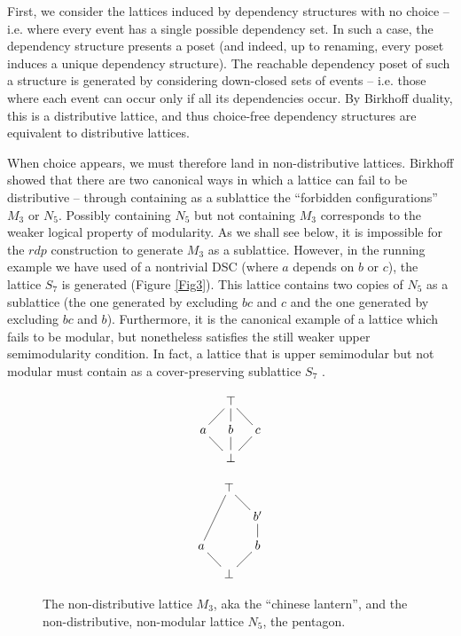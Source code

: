 \documentclass[hoptionsi,review,screen,format=sigconf]{acmart}
\theoremstyle{definition}
\begin{document}
First, we consider the lattices induced by dependency structures with no choice -- i.e. where every event has a single possible dependency set. In such a case, the dependency structure presents a poset (and indeed, up to renaming, every poset induces a unique dependency structure). The reachable dependency poset of such a structure is generated by considering down-closed sets of events -- i.e. those where each event can occur only if all its dependencies occur. By Birkhoff duality, this is a distributive lattice, and thus choice-free dependency structures are equivalent to distributive lattices.

When choice appears, we must therefore land in non-distributive lattices. Birkhoff showed that there are two canonical ways in which a lattice can fail to be distributive -- through containing as a sublattice the ``forbidden configurations'' \(M_3\) or \(N_5\). Possibly containing \(N_5\) but not containing \(M_3\) corresponds to the weaker logical property of modularity. As we shall see below, it is impossible for the \(rdp\) construction to generate \(M_3\) as a sublattice. However, in the running example we have used of a nontrivial DSC (where \(a\) depends on \(b\) or \(c\)), the lattice \(S_7\) is generated (Figure \ref{Fig3}). This lattice contains two copies of \(N_5\) as a sublattice (the one generated by excluding \(bc\) and \(c\) and the one generated by excluding \(bc\) and \(b\)). Furthermore, it is the canonical example of a lattice which fails to be modular, but nonetheless satisfies the still weaker upper semimodularity condition. In fact, a lattice that is upper semimodular but not modular must contain as a cover-preserving sublattice \(S_7\)  \cite{stern1999semimodular}. 

\begin{figure}
\begin{minipage}[c]{0.3\textwidth}
\begin{equation*}
    \xymatrix@=1em{& \top \ar@{-}[dl] \ar@{-}[d] \ar@{-}[dr] & \\
      a \ar@{-}[dr] & b \ar@{-}[d] & c \ar@{-}[dl]  \\
       & \bot &}
\end{equation*}
\end{minipage}
\begin{minipage}[c]{0.3\textwidth}
\begin{equation*}
    \xymatrix@=1em{& \top \ar@{-}[ddl] \ar@{-}[dr] & \\
      & & b'  \ar@{-}[d]  \\
      a \ar@{-}[dr] & & b \ar@{-}[dl] \\
      & \bot &}
\end{equation*}
\end{minipage}

\caption{The non-distributive lattice \(M_3\), aka the ``chinese lantern'', and the non-distributive, non-modular lattice \(N_5\), the pentagon.}
\label{Fig2}
\end{figure}
\end{document}
